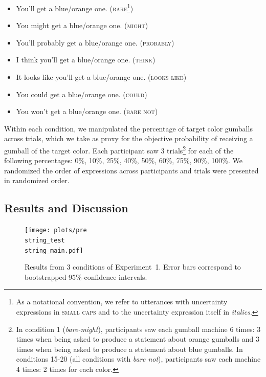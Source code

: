 \documentclass[man, floatsintext]{apa6}
\begin{document}
 \begin{itemize}
\item You'll get a blue/orange one. (\textsc{bare}\footnote{As a notational convention, we refer to utterances with uncertainty expressions in \textsc{small caps} and to the uncertainty expression itself in \textit{italics}. })
\item You might get a blue/orange one. (\textsc{might})
\item You'll probably get a blue/orange one. (\textsc{probably})
\item I think you'll get a blue/orange one. (\textsc{think})
\item It looks like you'll get a blue/orange one. (\textsc{looks like})
\item You could get a blue/orange one. (\textsc{could})
\item You won't get a blue/orange one. (\textsc{bare not})
\end{itemize}


\noindent Within each condition, we manipulated the percentage of target color gumballs across trials, which we take as proxy for the objective probability of receiving a gumball of the target color. 
Each participant saw 3 trials\footnote{In condition 1 (\textit{bare-might}), participants saw each gumball machine 6 times: 3 times when being asked to produce a statement about orange gumballs and 3 times when being asked to produce a statement about blue gumballs. In conditions 15-20 (all conditions with \textit{bare not}), participants saw each machine 4 times: 2 times for each color.} 
for each of the following percentages: 0\%, 10\%, 25\%, 40\%, 50\%, 60\%, 75\%, 90\%, 100\%. We randomized the order of expressions across participants and trials were presented in randomized order.

\subsection{Results and Discussion}

\begin{figure}
\texttt{[image: plots/pre\\string\_test\\string\_main.pdf]} 
\caption{Results from 3 conditions of Experiment~1. Error bars correspond to bootstrapped 95\%-confidence intervals. \label{fig:norming-results-main} }
\end{figure}
\end{document}
